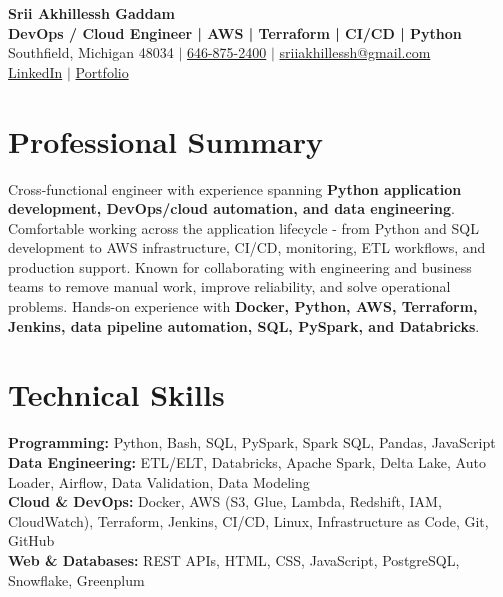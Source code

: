 \documentclass[letterpaper,10pt]{article}
\begin{document}
\fontsize{9.35pt}{10.45pt}\selectfont

\begin{center}
    {\LARGE \textbf{Srii Akhillessh Gaddam}} \\[-1pt]
    \textbf{DevOps / Cloud Engineer | AWS | Terraform | CI/CD | Python} \\[2pt]
    Southfield, Michigan 48034 $|$
    \href{tel:6468752400}{646-875-2400} $|$
    \href{mailto:sriiakhillessh@gmail.com}{sriiakhillessh@gmail.com} \\[1pt]
    \href{https://www.linkedin.com/in/srii-akhiilessh-gaddam-b48668191/}{LinkedIn} $|$
    \href{https://sriiakhillesshg.github.io/portfolio/}{Portfolio}
\end{center}
\vspace{-8pt}

\section{Professional Summary}
\small{Cross-functional engineer with experience spanning \textbf{Python application development, DevOps/cloud automation, and data engineering}. Comfortable working across the application lifecycle - from Python and SQL development to AWS infrastructure, CI/CD, monitoring, ETL workflows, and production support. Known for collaborating with engineering and business teams to remove manual work, improve reliability, and solve operational problems. Hands-on experience with \textbf{Docker, Python, AWS, Terraform, Jenkins, data pipeline automation, SQL, PySpark, and Databricks}.}

\section{Technical Skills}
\small{
\textbf{Programming:} Python, Bash, SQL, PySpark, Spark SQL, Pandas, JavaScript \\
\textbf{Data Engineering:} ETL/ELT, Databricks, Apache Spark, Delta Lake, Auto Loader, Airflow, Data Validation, Data Modeling \\
\textbf{Cloud \& DevOps:} Docker, AWS (S3, Glue, Lambda, Redshift, IAM, CloudWatch), Terraform, Jenkins, CI/CD, Linux, Infrastructure as Code, Git, GitHub \\
\textbf{Web \& Databases:} REST APIs, HTML, CSS, JavaScript, PostgreSQL, Snowflake, Greenplum
}
\end{document}
